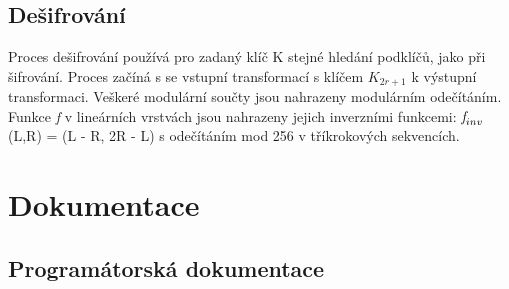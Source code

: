 \documentclass[12pt,a4paper]{article}
\let\oldsection\section
\renewcommand\section{\clearpage\oldsection}
\begin{document}
\subsection{Dešifrování}
Proces dešifrování používá pro zadaný klíč K stejné hledání podklíčů, jako při šifrování. Proces začíná s se vstupní transformací s klíčem $K_{2r+1}$ k výstupní transformaci. Veškeré modulární součty jsou nahrazeny modulárním odečítáním.
Funkce \emph{f} v lineárních vrstvách jsou nahrazeny jejich inverzními funkcemi: $\emph{f}_{inv}$(L,R) = (L - R, 2R - L) s odečítáním mod 256 v tříkrokových sekvencích.

{\section{Dokumentace}}

{\subsection{Programátorská dokumentace}}
\end{document}
